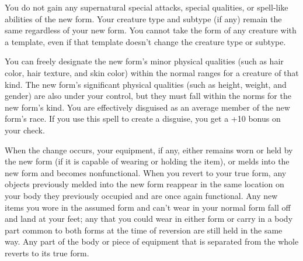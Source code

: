 {	You do not gain any supernatural special attacks, special qualities, or spell-like abilities of the new form. Your creature type and subtype (if any) remain the same regardless of your new form. You cannot take the form of any creature with a template, even if that template doesn't change the creature type or subtype.

	You can freely designate the new form's minor physical qualities (such as hair color, hair texture, and skin color) within the normal ranges for a creature of that kind. The new form's significant physical qualities (such as height, weight, and gender) are also under your control, but they must fall within the norms for the new form's kind. You are effectively disguised as an average member of the new form's race. If you use this spell to create a disguise, you get a +10 bonus on your  check.

	When the change occurs, your equipment, if any, either remains worn or held by the new form (if it is capable of wearing or holding the item), or melds into the new form and becomes nonfunctional. When you revert to your true form, any objects previously melded into the new form reappear in the same location on your body they previously occupied and are once again functional. Any new items you wore in the assumed form and can't wear in your normal form fall off and land at your feet; any that you could wear in either form or carry in a body part common to both forms at the time of reversion are still held in the same way. Any part of the body or piece of equipment that is separated from the whole reverts to its true form.

}
